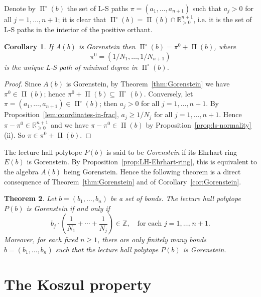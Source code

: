 \documentclass[12pt, a4paper]{amsart}   	%
\numberwithin{equation}{section}
\theoremstyle{plain}
\newtheorem{theorem}{Theorem}[section]
\newtheorem{corollary}[theorem]{Corollary}
\theoremstyle{definition}
\DeclareMathOperator{\LS}{\Pi}
\newcommand{\ZZ}{\mathbb{Z}}
\newcommand{\RR}{\mathbb{R}}
\begin{document}
Denote by $\LS^\circ(b)$ the set of L-S paths $\pi = (a_1, \ldots, a_{n+1})$ such that $a_j > 0$ for all $j = 1, \ldots, n+1$; it is clear that $\LS^\circ(b) = \LS(b)\cap\RR^{n+1}_{>0}$, i.e. it is the set of L-S paths in the interior of the positive orthant. 

\begin{corollary}\label{cor:Gorenstein-open-part}
If $A(b)$ is Gorenstein then $\LS^\circ(b) = \pi^0 + \LS(b)$, where
\[
\pi^0 = (1/N_1, \ldots, 1/N_{n+1})
\]
is the unique L-S path of minimal degree in $\LS^\circ(b)$.
\end{corollary}
 \begin{proof} Since $A(b)$ is Gorenstein, by Theorem~\ref{thm:Gorenstein} we have $\pi^0\in\LS(b)$; hence $\pi^0 + \LS(b)\subseteq\LS^\circ(b)$. Conversely, let $\pi = (a_1, \ldots, a_{n+1})\in\LS^\circ(b)$; then $a_j > 0$ for all $j = 1, \ldots, n+1$. By Proposition~\ref{lem:coordinates-in-frac}, $a_j\geq 1/N_j$ for all $j = 1, \ldots, n+1$. Hence $\pi - \pi^0\in\RR^{n+1}_{\ge0}$ and we have $\pi - \pi^0\in\LS(b)$ by Proposition~\ref{prop:ls-normality}(ii). So $\pi \in\pi^0 +\LS(b)$.
\end{proof}

\smallskip

The lecture hall polytope $P(b)$ is said to be \emph{Gorenstein} if its Ehrhart ring $E(b)$ is Gorenstein. By Proposition~\ref{prop:LH-Ehrhart-ring}, this is equivalent to the algebra $A(b)$ being Gorenstein. Hence the following theorem is a direct consequence of Theorem~\ref{thm:Gorenstein} and of Corollary~\ref{cor:Gorenstein}.
\begin{theorem}\label{thm:Gorenstein-LH}
Let $b=(b_1,\ldots,b_n)$ be a set of bonds. The lecture hall polytope $P(b)$ is Gorenstein if and only if
\[
b_j\cdot\left(\frac{1}{N_1} + \cdots + \frac{1}{N_j}\right) \in \ZZ, \quad \textrm{for each }j = 1, \ldots, n+1.
\]
Moreover, for each fixed $n\geq 1$, there are only finitely many bonds $b = (b_1, \ldots, b_n)$ such that the lecture hall polytope $P(b)$ is Gorenstein.
\end{theorem}


\section{The Koszul property}\label{Sec:6}
\end{document}

